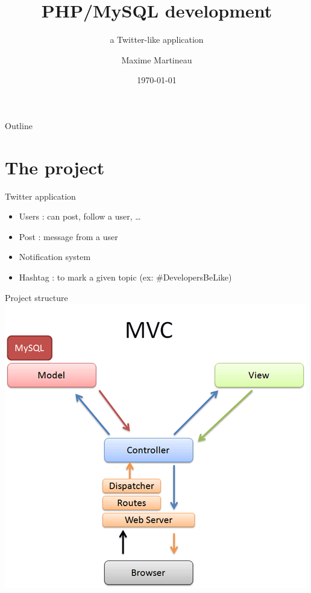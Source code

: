 \documentclass{beamer}
\title{PHP/MySQL development}
\subtitle{a Twitter-like application}
\author{Maxime Martineau }
\institute[Polytech Tours] %
{
    Polytech Tours Département Informatique  
}
\date{\today}
\begin{document}
\begin{frame}
  \titlepage
\end{frame}

\begin{frame}{Outline}
    \tableofcontents
\end{frame}

\section{The project}
\begin{frame}
    Twitter application
    
    \begin{itemize}
        \item Users : can post, follow a user, …
        \item Post : message from a user
        \item Notification system
        \item Hashtag : to mark a given topic (ex: \#DevelopersBeLike)
    \end{itemize}
\end{frame}

\begin{frame}{Project structure}
\center
\includegraphics[scale=0.3]{images/mvc-rails.png}
\end{frame}
\end{document}
